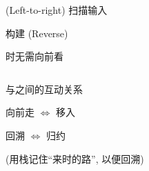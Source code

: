 \begin{frame}{}
  \begin{center}

    \vspace{0.80cm}
    \begin{columns}
        \begin{description}
          \setlength{\itemsep}{15pt}
          \item[$L:$]  (Left-to-right) 扫描输入
          \item[$R:$] 构建 (Reverse) 
          \item[$0:$] 时无需向前看
        \end{description}
    \end{columns}
  \end{center}
\end{frame}

\begin{frame}{}
  \begin{center}
    与之间的互动关系

    \vspace{0.80cm}
    向前走 $\Leftrightarrow$ 移入

    \vspace{0.50cm}
    回溯   $\Leftrightarrow$ 归约

    \vspace{1.00cm}

    \vspace{0.20cm}
    (用栈记住``来时的路'', 以便回溯)
  \end{center}
\end{frame}
